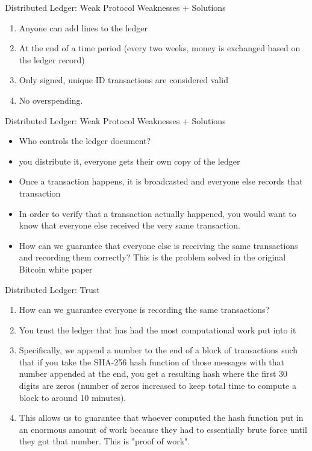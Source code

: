 \documentclass[handout]{beamer}
\begin{document}
\begin{frame}{Distributed Ledger: Weak Protocol Weaknesses + Solutions}
    \begin{enumerate}
        \item \pause Anyone can add lines to the ledger
        \item \pause At the end of a time period (every two weeks, money is exchanged based on the ledger record)
        \item \pause Only signed, unique ID transactions are considered valid
        \item \pause No overspending.
    \end{enumerate}
\end{frame}

\begin{frame}{Distributed Ledger: Weak Protocol Weaknesses + Solutions}
    \begin{itemize}
        \item \pause Who controls the ledger document?
        \item \pause you distribute it, everyone gets their own copy of the ledger
        \item \pause Once a transaction happens, it is broadcasted and everyone else records that transaction
        \item \pause In order to verify that a transaction actually happened, you would want to know that everyone else received the very same transaction.
        \item \pause How can we guarantee that everyone else is receiving the same transactions and recording them correctly? This is the problem solved in the original Bitcoin white paper
    \end{itemize}
\end{frame}

\begin{frame}{Distributed Ledger: Trust}
    \begin{enumerate}
        \item \pause How can we guarantee everyone is recording the same transactions?
        \item \pause You trust the ledger that has had the most computational work put into it 
        \item \pause Specifically, we append a number to the end of a block of transactions such that if you take the SHA-256 hash function of those messages with that number appended at the end, you get a resulting hash where the first 30 digits are zeros (number of zeros increased to keep total time to compute a block to around 10 minutes). 
        \item \pause This allows us to guarantee that whoever computed the hash function put in an enormous amount of work because they had to essentially brute force until they got that number. This is "proof of work".
    \end{enumerate}
\end{frame}
\end{document}
